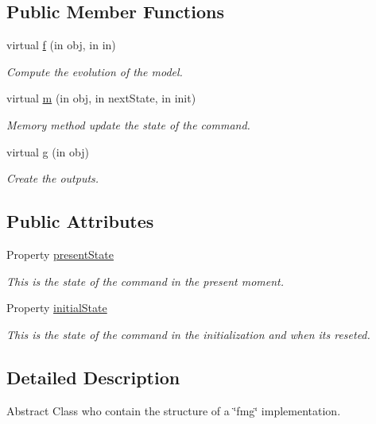 \subsection*{Public Member Functions}
\begin{DoxyCompactItemize}
\item 
virtual \hyperlink{class_model_s_e_d_ac36f9451c43b120828af4380858f2024}{f} (in obj, in in)
\begin{DoxyCompactList}\small\item\em Compute the evolution of the model. \end{DoxyCompactList}\item 
virtual \hyperlink{class_model_s_e_d_adb8aaccb857cf5bbec640cd00915459d}{m} (in obj, in next\+State, in init)
\begin{DoxyCompactList}\small\item\em Memory method update the state of the command. \end{DoxyCompactList}\item 
virtual \hyperlink{class_model_s_e_d_ac6bf71081e35755d5ed9992d165afcb8}{g} (in obj)
\begin{DoxyCompactList}\small\item\em Create the outputs. \end{DoxyCompactList}\end{DoxyCompactItemize}
\subsection*{Public Attributes}
\begin{DoxyCompactItemize}
\item 
Property \hyperlink{class_model_s_e_d_a9624cc7c421a50fa5086b0ebd0cd5fe3}{present\+State}
\begin{DoxyCompactList}\small\item\em This is the state of the command in the present moment. \end{DoxyCompactList}\item 
Property \hyperlink{class_model_s_e_d_acd9263acfa96c9138afdf497e55acc24}{initial\+State}
\begin{DoxyCompactList}\small\item\em This is the state of the command in the initialization and when it\textquotesingle{}s reseted. \end{DoxyCompactList}\end{DoxyCompactItemize}


\subsection{Detailed Description}
Abstract Class who contain the structure of a \char`\"{}fmg\char`\"{} implementation. 

